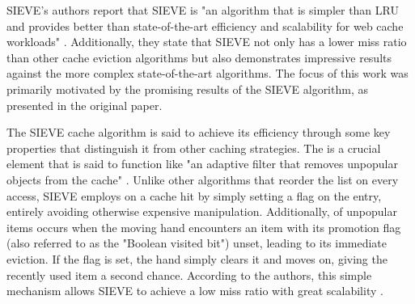 SIEVE's authors report that SIEVE is "an algorithm that is simpler than LRU and provides better than state-of-the-art efficiency and scalability for web cache workloads" \cite{sieve}. Additionally, they state that SIEVE not only has a lower miss ratio than other cache eviction algorithms but also demonstrates impressive results against the more complex state-of-the-art algorithms. The focus of this work was primarily motivated by the promising results of the SIEVE algorithm, as presented in the original paper.

The SIEVE cache algorithm is said to achieve its efficiency through some key properties that distinguish it from other caching strategies. The  is a crucial element that is said to function like "an adaptive filter that removes unpopular objects from the cache" \cite{sieve}. Unlike other algorithms that reorder the list on every access, SIEVE employs  on a cache hit by simply setting a flag on the entry, entirely avoiding otherwise expensive manipulation. Additionally,  of unpopular items occurs when the moving hand encounters an item with its promotion flag (also referred to as the "Boolean visited bit") unset, leading to its immediate eviction. If the flag is set, the hand simply clears it and moves on, giving the recently used item a second chance. According to the authors, this simple mechanism allows SIEVE to achieve a low miss ratio with great scalability \cite{sieve}.




